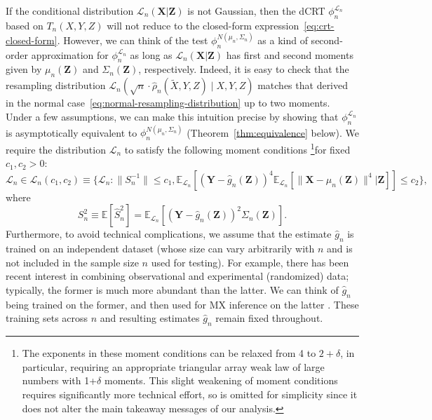 \documentclass[ejs]{imsart}
\numberwithin{equation}{section}
\theoremstyle{plain}
\theoremstyle{definition}
\theoremstyle{remark}
\newcommand{\prx}{\bm X}
\newcommand{\srx}{X}
\newcommand{\prz}{\bm Z}
\newcommand{\srz}{Z}
\newcommand{\srxk}{\widetilde X}
\newcommand{\pry}{{\bm Y}}
\newcommand{\sry}{Y}
\begin{document}
If the conditional distribution $\mathcal L_n(\prx|\prz)$ is not Gaussian, then the dCRT $\phi_n^{\mathcal L_n}$ based on $T_n(\srx, \sry, \srz)$ will not reduce to the closed-form expression~\eqref{eq:crt-closed-form}. However, we can think of the test $\phi^{N(\mu_n, \Sigma_n)}_n$ as a kind of second-order approximation for $\phi_n^{\mathcal L_n}$ as long as $\mathcal L_n(\prx|\prz)$ has first and second moments given by $\mu_n(\prz)$ and $\Sigma_n(\prz)$, respectively. Indeed, it is easy to check that the resampling distribution $\mathcal L_n(\sqrt n \cdot \widehat \rho_n(\srxk, \sry, \srz) \mid \srx, \sry, \srz)$ matches that derived in the normal case~\eqref{eq:normal-resampling-distribution} up to two moments. Under a few assumptions, we can make this intuition precise by showing that $\phi_n^{\mathcal L_n}$ is asymptotically equivalent to $\phi^{N(\mu_n, \Sigma_n)}_n$ (Theorem~\ref{thm:equivalence} below). We require the distribution $\mathcal L_n$ to satisfy the following moment conditions \footnote{The exponents in these moment conditions can be relaxed from 4 to $2+\delta$, in particular, requiring an appropriate triangular array weak law of large numbers with 1+$\delta$ moments. This slight weakening of moment conditions requires significantly more technical effort, so is omitted for simplicity since it does not alter the main takeaway messages of our analysis.}for fixed $c_1, c_2 > 0$:
\small
\begin{equation}
\mathcal L_n \in \mathscr L_n(c_1, c_2) \equiv \{\mathcal L_n: \|S_{n}^{-1}\| \leq c_1, \mathbb E_{\mathcal L_n}\left[(\pry - \widehat g_n(\prz))^{4} \mathbb E_{\mathcal L_n}[\|\prx - \mu_n(\prz)\|^{4}|\prz]\right] \leq c_2 \},
\label{eq:moment-conditions}
\end{equation} 
\normalsize
where
\begin{equation}
S_n^2 \equiv \mathbb E[\widehat S_n^2] = \mathbb E_{\mathcal L_n}\left[(\pry - \widehat g_n(\prz))^2 \Sigma_n(\prz)\right].
\end{equation}
Furthermore, to avoid technical complications, we assume that the estimate $\widehat g_n$ is trained on an independent dataset (whose size can vary arbitrarily with $n$ and is not included in the sample size $n$ used for testing). For example, there has been recent interest in combining observational and experimental (randomized) data; typically, the former is much more abundant than the latter. We can think of $\widehat g_n$ being trained on the former, and then used for MX inference on the latter \citep{Bates2020}.
These training sets across $n$ and resulting estimates $\widehat g_n$ remain fixed throughout.
\end{document}
